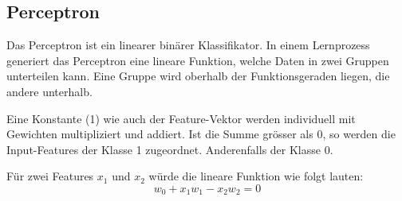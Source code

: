 \subsection{Perceptron}
\begin{flushleft}

                        
Das Perceptron ist ein linearer binärer Klassifikator. In einem Lernprozess generiert das Perceptron eine lineare Funktion, welche Daten in zwei Gruppen unterteilen kann. Eine Gruppe wird oberhalb der Funktionsgeraden liegen, die andere unterhalb.

Eine Konstante (1) wie auch der Feature-Vektor werden individuell mit Gewichten multipliziert und addiert. Ist die Summe grösser als 0, so werden die Input-Features der Klasse 1 zugeordnet. Anderenfalls der Klasse 0.

Für zwei Features $x_{1}$ und $x_{2}$ würde die lineare Funktion wie folgt lauten:
$$w_{0} + x_{1}w_{1} - x_{2}w_{2} = 0$$
                        
                        
\newcommand{\myThresholdFunction}{
\draw[thick] %
			 (-0.5em,1.25em) -- (-0.5em,-1.25em)
(-0.5em,1.25em) -- (0.5em,1.25em)
(-0.5em,-1.25em) -- (-1.5em,-1.25em)
;}


\begin{figure}[H]
\centering
\label{fig:perceptron}
\end{figure}
\end{flushleft}
